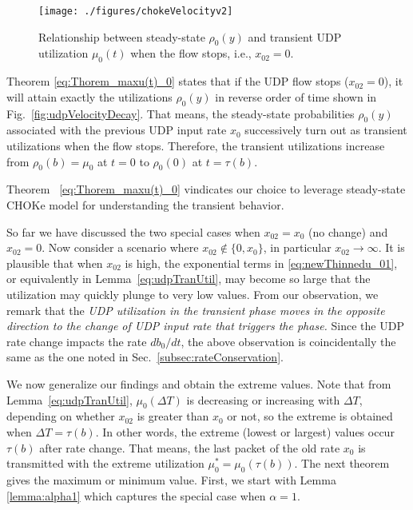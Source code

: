 \documentclass{IEEEtran}
\begin{document}
    \begin{figure}[h!]
            \centering
            \texttt{[image: ./figures/chokeVelocityv2]}\caption{Relationship between steady-state $\rho_0(y)$ and transient UDP utilization $\mu_0(t)$ when the flow stops, i.e., $x_{02}=0$.}
            \label{fig:relation-rho0(y)-udpTran}
    \end{figure}

    Theorem \ref{eq:Thorem_maxu(t)_0} states that if the UDP flow stops ($x_{02}=0$), it will attain exactly the utilizations $\rho_0(y)$ in reverse order of time shown in Fig.~\ref{fig:udpVelocityDecay}. That means, the steady-state probabilities $\rho_0(y)$ associated with the previous UDP input rate $x_0$ successively turn out as transient utilizations when the flow stops. Therefore, the transient utilizations increase from $\rho_0(b)=\mu_0$ at $t=0$ to $\rho_0(0)$ at $t=\tau(b)$.

    Theorem ~\ref{eq:Thorem_maxu(t)_0} vindicates our choice to leverage steady-state CHOKe model for understanding the transient behavior.

     So far we have discussed the two special cases when $x_{02}=x_0$ (no change) and $x_{02}=0$. Now consider a scenario where  $x_{02}\notin \{0,x_0\}$, in particular $x_{02}\rightarrow \infty$. It is plausible that when $x_{02}$ is high, the exponential terms in \eqref{eq:newThinnedu_01}, or equivalently in Lemma~\ref{eq:udpTranUtil}, may become so large that the utilization may quickly plunge to very low values. From our observation, we remark that the \emph{UDP utilization in the transient phase moves in the opposite direction to the change of UDP input rate that triggers the phase. } Since the UDP rate change impacts the rate $db_0/dt$, the above observation is coincidentally the same as the one noted in Sec.~\ref{subsec:rateConservation}.

     We now generalize our findings and obtain the extreme values. Note that from Lemma~\ref{eq:udpTranUtil}, $\mu_0(\Delta T)$ is decreasing or increasing with $\Delta T$, depending on whether $x_{02}$ is greater than $x_0$ or not, so the extreme is obtained when $\Delta T= \tau(b)$. In other words, the extreme (lowest or largest) values occur $\tau(b)$ after rate change. That means, the last packet of the old rate $x_0$ is transmitted with the extreme utilization $\mu_0^{*}=\mu_0(\tau(b))$.  The next theorem gives the maximum or minimum value. First, we start with Lemma \ref{lemma:alpha1} which captures the special case when $\alpha=1$.
\end{document}
